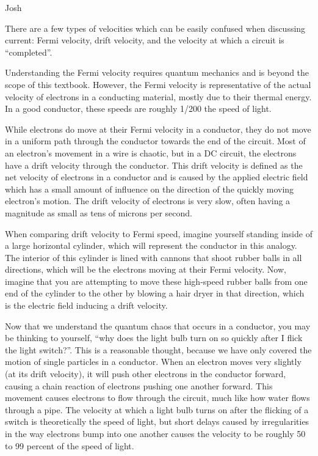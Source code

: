\begin{studentOpinion}{Josh}{
There are a few types of velocities which can be easily confused when discussing current: Fermi velocity, drift velocity, and the velocity at which a circuit is ``completed''.

Understanding the Fermi velocity requires quantum mechanics and is beyond the scope of this textbook. However, the Fermi velocity is representative of the actual velocity of electrons in a conducting material, mostly due to their thermal energy. In a good conductor, these speeds are roughly 1/200 the speed of light.

While electrons do move at their Fermi velocity in a conductor, they do not move in a uniform path through the conductor towards the end of the circuit. Most of an electron's movement in a wire is chaotic, but in a DC circuit, the electrons have a drift velocity through the conductor. This drift velocity is defined as the net velocity of electrons in a conductor and is caused by the applied electric field which has a small amount of influence on the direction of the quickly moving electron's motion. The drift velocity of electrons is very slow, often having a magnitude as small as tens of microns per second.

When comparing drift velocity to Fermi speed, imagine yourself standing inside of a large horizontal cylinder, which will represent the conductor in this analogy. The interior of this cylinder is lined with cannons that shoot rubber balls in all directions, which will be the electrons moving at their Fermi velocity. Now, imagine that you are attempting to move these high-speed rubber balls from one end of the cylinder to the other by blowing a hair dryer in that direction, which is the electric field inducing a drift velocity.

Now that we understand the quantum chaos that occurs in a conductor, you may be thinking to yourself, ``why does the light bulb turn on so quickly after I flick the light switch?''. This is a reasonable thought, because we have only covered the motion of single particles in a conductor. When an electron moves very slightly (at its drift velocity), it will push other electrons in the conductor forward, causing a chain reaction of electrons pushing one another forward. This movement causes electrons to flow through the circuit, much like how water flows through a pipe. The velocity at which a light bulb turns on after the flicking of a switch is theoretically the speed of light, but short delays caused by irregularities in the way electrons bump into one another causes the velocity to be roughly 50 to 99 percent of the speed of light.
}
\end{studentOpinion}

